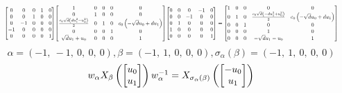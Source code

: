 \documentclass[11pt]{article}
\theoremstyle{definition}
\begin{document}
\[
\scaletoalign{\textwidth}{{\left[\begin{matrix}0 & 0 & 0 & 1 & 0\\0 & 0 & 1 & 0 & 0\\0 & -1 & 0 & 0 & 0\\-1 & 0 & 0 & 0 & 0\\0 & 0 & 0 & 0 & 1\end{matrix}\right]} {\left[\begin{matrix}1 & 0 & 0 & 0 & 0\\0 & 1 & 0 & 0 & 0\\\frac{c_{0} \sqrt{d} \left(d u_{1}^{2} - u_{0}^{2}\right)}{2} & 0 & 1 & 0 & c_{0} \left(- \sqrt{d} u_{0} + d u_{1}\right)\\0 & 0 & 0 & 1 & 0\\\sqrt{d} u_{1} + u_{0} & 0 & 0 & 0 & 1\end{matrix}\right]} {\left[\begin{matrix}0 & 0 & 0 & -1 & 0\\0 & 0 & -1 & 0 & 0\\0 & 1 & 0 & 0 & 0\\1 & 0 & 0 & 0 & 0\\0 & 0 & 0 & 0 & 1\end{matrix}\right]} = {\left[\begin{matrix}1 & 0 & 0 & 0 & 0\\0 & 1 & 0 & \frac{c_{0} \sqrt{d} \left(- d u_{1}^{2} + u_{0}^{2}\right)}{2} & c_{0} \left(- \sqrt{d} u_{0} + d u_{1}\right)\\0 & 0 & 1 & 0 & 0\\0 & 0 & 0 & 1 & 0\\0 & 0 & 0 & - \sqrt{d} u_{1} - u_{0} & 1\end{matrix}\right]}}
\]
\[
\alpha = \left( -1, \  -1, \  0, \  0, \  0\right), \beta = \left( -1, \  1, \  0, \  0, \  0\right), \sigma_{\alpha}(\beta) = \left( -1, \  1, \  0, \  0, \  0\right)
\]
\[
\scaletoalign{\textwidth}{w_{\alpha} X_{\beta}\left(\left[\begin{matrix}u_{0}\\u_{1}\end{matrix}\right]\right) w_{\alpha}^{-1} = X_{\sigma_{\alpha}\left(\beta\right)}\left(\left[\begin{matrix}- u_{0}\\u_{1}\end{matrix}\right]\right)}
\]
\end{document}
